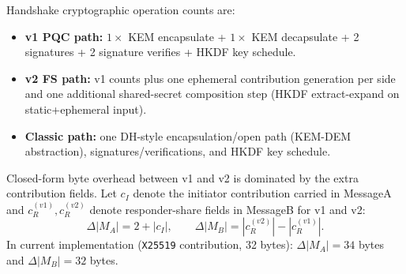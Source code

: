 \documentclass[10pt,journal,compsoc]{IEEEtran}
\providecommand{\tightlist}{%
  \setlength{\itemsep}{0pt}\setlength{\parskip}{0pt}}
\begin{document}
Handshake cryptographic operation counts are:
\begin{itemize}\tightlist
\item \textbf{v1 PQC path:} $1\times$ KEM encapsulate + $1\times$ KEM decapsulate + 2 signatures + 2 signature verifies + HKDF key schedule.
\item \textbf{v2 FS path:} v1 counts plus one ephemeral contribution generation per side and one additional shared-secret composition step (HKDF extract-expand on static+ephemeral input).
\item \textbf{Classic path:} one DH-style encapsulation/open path (KEM-DEM abstraction), signatures/verifications, and HKDF key schedule.
\end{itemize}

Closed-form byte overhead between v1 and v2 is dominated by the extra
contribution fields. Let $c_I$ denote the initiator contribution carried
in MessageA and $c_R^{(v1)}, c_R^{(v2)}$ denote responder-share fields
in MessageB for v1 and v2:
\[
\Delta |M_A| = 2 + |c_I|,
\qquad
\Delta |M_B| = |c_R^{(v2)}| - |c_R^{(v1)}|.
\]
In current implementation (\texttt{X25519} contribution, 32 bytes):
$\Delta |M_A| = 34$ bytes and $\Delta |M_B| = 32$ bytes.
\end{document}
